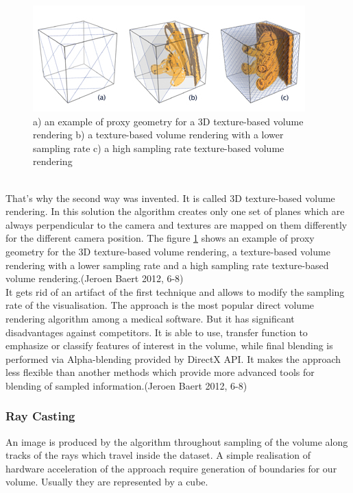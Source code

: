 \documentclass[twoside, english, 11pt]{report}
\begin{document}
\begin{figure}[!h]
\centerline{
\includegraphics[scale=0.75]{img/texture-based}
}
\caption{a) an example of proxy geometry for a 3D texture-based volume rendering b) a texture-based volume rendering with a lower sampling rate c) a high sampling rate texture-based volume rendering\label{fig:text}}
\end{figure}
\\
That's why the second way was invented. It is called 3D texture-based volume rendering. In this solution the algorithm creates only one set of planes which are always perpendicular to the camera and textures are mapped on them differently for the different camera position. The figure \ref{fig:text} shows an example of proxy geometry for the 3D texture-based volume rendering, a texture-based volume rendering with a lower sampling rate and a high sampling rate texture-based volume rendering.(Jeroen Baert 2012, 6-8)\\

It gets rid of an artifact of the first technique and allows to modify the sampling rate of the visualisation. The approach is the most popular direct volume rendering algorithm among a medical software. But it has significant disadvantages against competitors. It is able to use, transfer function to emphasize or classify features of interest in the volume, while final blending is performed via Alpha-blending provided by DirectX API. It makes the approach less flexible than another methods which provide more advanced tools for blending of sampled information.(Jeroen Baert 2012, 6-8)

\subsubsection{Ray Casting}

An image is produced by the algorithm throughout sampling of the volume along tracks of the rays which travel inside the dataset. A simple realisation of hardware acceleration of the approach require generation of boundaries for our volume. Usually they are represented by a cube.\\
\end{document}
